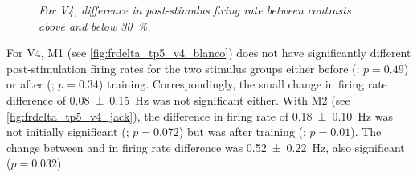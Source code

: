 %

\begin{figure}[htbp]%
    \centering
    \hspace*{\fill}
    \hspace*{\fill}\hspace{.2cm}\hspace*{\fill}
    \hspace*{\fill}
    \caption{\textit{For \ac{V4}, difference in post-stimulus firing rate between contrasts above and below \SI{30}{\percent}.}
    \label{fig:frdelta_tp5_v4}
}
\end{figure}

For \ac{V4}, \ac{M1} (see \autoref{fig:frdelta_tp5_v4_blanco}) does not have significantly different post-stimulation firing rates for the two stimulus groups either before (; $p=0.49$) or after (; $p=0.34$) training.
Correspondingly, the small change in firing rate difference of \SI{+0.08\pm0.15}{Hz} was not significant either.
With \ac{M2} (see \autoref{fig:frdelta_tp5_v4_jack}), the difference in firing rate of \SI{+0.18\pm0.10}{Hz} was not initially significant (; $p=0.072$) but was after training (; $p=0.01$).
The change between  and  in firing rate difference was \SI{+0.52\pm0.22}{Hz}, also significant ($p=0.032$).


